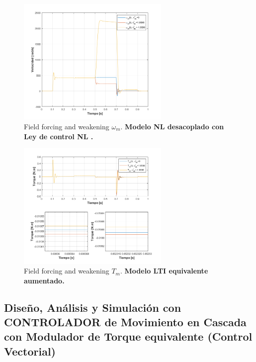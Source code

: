 \documentclass[10pt]{article}
\begin{document}
\begin{itemize}
		\begin{figure}[h!]
	\centering
	\includegraphics[width=0.65\textwidth]{wdistintode0.png}
	\caption{\label{fig:wdistintode0} Field forcing and weakening $\omega_{m}$.\textbf{ Modelo NL desacoplado con Ley de control NL .}}
	\end{figure}
	\begin{figure}[h!]
	\centering
	\includegraphics[width=0.65\textwidth]{Tdistintode0LTI.png}
	\caption{\label{fig:Tdistintode0LTI} Field forcing and weakening $T_{m}$.\textbf{ Modelo LTI equivalente aumentado.}}
	\end{figure}
\end{itemize}
\newpage
\subsection{Diseño, Análisis y Simulación con CONTROLADOR de Movimiento en Cascada con Modulador de Torque equivalente (Control Vectorial)}
\end{document}
